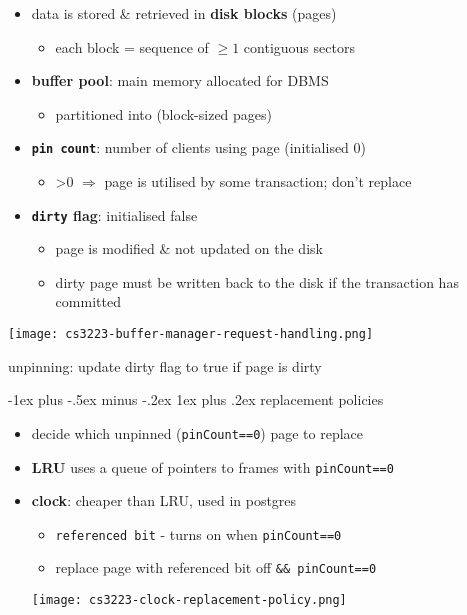 \documentclass[10pt, landscape]{article}
\makeatletter
\renewcommand{\subsubsection}{\@startsection{subsubsection}{3}{0mm}%
  {-1ex plus -.5ex minus -.2ex}%
  {1ex plus .2ex}%
{\normalfont\small\bfseries}}%
\makeatother
\begin{document}
\begin{multicols*}{4}
  \begin{itemize}
    \item data is stored \& retrieved in \textbf{disk blocks} (pages)
          \begin{itemize}
            \item each block = sequence of $\geq 1$ contiguous sectors
          \end{itemize}
    \item \textbf{buffer pool}: main memory allocated for DBMS
          \begin{itemize}
            \item partitioned into  (block-sized pages)
          \end{itemize}
    \item \textbf{\texttt{pin count}}: number of clients using page (initialised 0)
          \begin{itemize}
            \item >0 $\Rightarrow$ page is utilised by some transaction; don't replace
          \end{itemize}
    \item \textbf{\texttt{dirty} flag}: initialised false
          \begin{itemize}
            \item {} page is modified \& not updated on the disk
            \item dirty page must be written back to the disk if the transaction has committed
          \end{itemize}
  \end{itemize}

  \texttt{[image: cs3223-buffer-manager-request-handling.png]}

  \attention unpinning: update dirty flag to true if page is dirty

  \subsubsection{replacement policies}

  \begin{itemize}
    \item decide which unpinned (\texttt{pinCount==0}) page to replace
    \item \textbf{LRU} uses a queue of pointers to frames with \texttt{pinCount==0}
    \item \textbf{clock}: cheaper than LRU, used in postgres
          \begin{itemize}
            \item \texttt{referenced bit} - turns on when \texttt{pinCount==0}
            \item replace page with referenced bit off \texttt{\&\& pinCount==0}
          \end{itemize}
          \texttt{[image: cs3223-clock-replacement-policy.png]}
  \end{itemize}


\end{multicols*}
\end{document}
